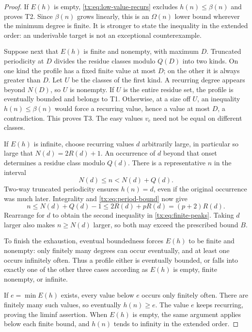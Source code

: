 \begin{proof}
If $E(h)$ is empty, \eqref{tx:eq:low-value-recurs} excludes
$h(n)\le\beta(n)$ and proves T2. Since $\beta(n)$ grows linearly,
this is an $\Omega(n)$ lower bound wherever the minimum degree is
finite. It is stronger to state the inequality in the extended order:
an underivable target is not an exceptional counterexample.

Suppose next that $E(h)$ is finite and nonempty, with maximum $D$.
Truncated periodicity at $D$ divides the residue classes modulo $Q(D)$
into two kinds. On one kind the profile has a fixed finite value at
most $D$; on the other it is always greater than $D$. Let $U$ be the
classes of the first kind. A recurring degree appears beyond $N(D)$,
so $U$ is nonempty. If $U$ is the entire residue set, the profile is
eventually bounded and belongs to T1. Otherwise, at a size off $U$,
an inequality $h(n)\le\beta(n)$ would force a recurring value, hence
a value at most $D$, a contradiction. This proves T3. The easy values
$v_c$ need not be equal on different classes.

If $E(h)$ is infinite, choose recurring values $d$ arbitrarily large,
in particular so large that $N(d)=2R(d)+1$. An occurrence of $d$
beyond that onset determines a residue class modulo $Q(d)$. There is
a representative $n$ in the interval
\[
                           N(d)\le n<N(d)+Q(d).
\]
Two-way truncated periodicity ensures $h(n)=d$, even if the original
occurrence was much later. Integrality and \eqref{tx:eq:period-bound}
now give
\[
              n\le N(d)+Q(d)-1\le 2R(d)+pR(d)=(p+2)R(d).
\]
Rearrange for $d$ to obtain the second inequality in
\eqref{tx:eq:finite-peaks}. Taking $d$ larger also makes $n\ge N(d)$
larger, so both may exceed the prescribed bound $B$.

To finish the exhaustion, eventual boundedness forces $E(h)$ to be
finite and nonempty: only finitely many degrees can occur eventually,
and at least one occurs infinitely often. Thus a profile either is
eventually bounded, or falls into exactly one of the other three cases
according as $E(h)$ is empty, finite nonempty, or infinite.

If $e=\min E(h)$ exists, every value below $e$ occurs only finitely
often. There are finitely many such values, so eventually $h(n)\ge e$.
The value $e$ keeps recurring, proving the liminf assertion. When
$E(h)$ is empty, the same argument applies below each finite bound,
and $h(n)$ tends to infinity in the extended order.
\end{proof}

